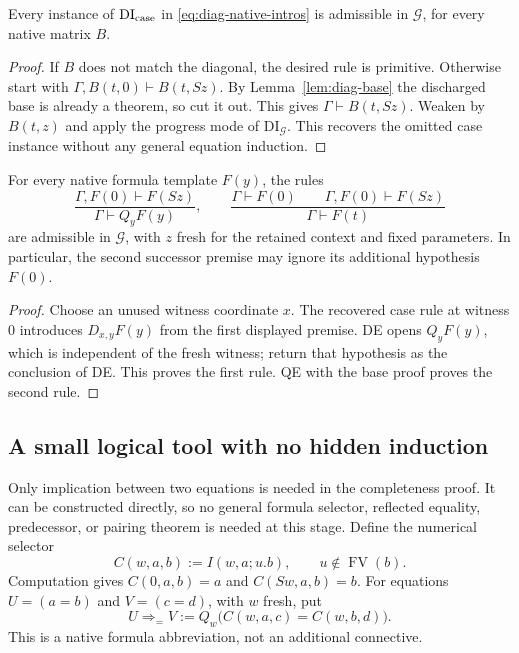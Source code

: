 \begin{lemma}
\label{lem:diag-all-cases}
Every instance of $\mathrm{DI}_{\rm case}$ in
\eqref{eq:diag-native-intros} is admissible in $\mathcal G$, for every
native matrix $B$.
\end{lemma}
\begin{proof}
If $B$ does not match the diagonal, the desired rule is primitive.
Otherwise start with
$\Gamma,B(t,0)\vdash B(t,Sz)$.
By Lemma~\ref{lem:diag-base} the discharged base is already a theorem,
so cut it out.  This gives $\Gamma\vdash B(t,Sz)$.
Weaken by $B(t,z)$ and apply the progress mode of
$\mathrm{DI}_{\mathcal G}$.
This recovers the omitted case instance without any general equation
induction.
\end{proof}

\begin{lemma}
\label{lem:diag-case-interface}
For every native formula template $F(y)$, the rules
\[
 \frac{\Gamma,F(0)\vdash F(Sz)}{\Gamma\vdash Q_yF(y)},
 \qquad
 \frac{\Gamma\vdash F(0)\qquad\Gamma,F(0)\vdash F(Sz)}
      {\Gamma\vdash F(t)}
\]
are admissible in $\mathcal G$, with $z$ fresh for the retained
context and fixed parameters.  In particular, the second successor
premise may ignore its additional hypothesis $F(0)$.
\end{lemma}
\begin{proof}
Choose an unused witness coordinate $x$.  The recovered case rule at
witness $0$ introduces $D_{x,y}F(y)$ from the first displayed premise.
DE opens $Q_yF(y)$, which is independent of the fresh witness; return
that hypothesis as the conclusion of DE.  This proves the first rule.
QE with the base proof proves the second rule.
\end{proof}

\subsection{A small logical tool with no hidden induction}

Only implication between two equations is needed in the completeness
proof.  It can be constructed directly, so no general formula selector,
reflected equality, predecessor, or pairing theorem is needed at this
stage.  Define the numerical selector
\[
 C(w,a,b):=I(w,a;u.b),\qquad u\notin\operatorname{FV}(b).
\]
Computation gives $C(0,a,b)=a$ and $C(Sw,a,b)=b$.
For equations $U=(a=b)$ and $V=(c=d)$, with $w$ fresh, put
\begin{equation}
 U\Rightarrow_{=}V
   :=Q_w\bigl(C(w,a,c)=C(w,b,d)\bigr).
 \label{eq:diag-equational-implication}
\end{equation}
This is a native formula abbreviation, not an additional connective.


